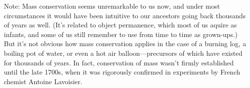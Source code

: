\vspace{\fill}

Note: Mass conservation seems unremarkable to us now, and under most circumstances it would have been intuitive to our ancestors going back thousands of years as well.  (It's related to object permanence, which most of us aquire as infants, and some of us still remember to use from time to time as grown-ups.)  But it's not obvious how mass conservation applies in the case of a burning log, a boiling pot of water, or even a hot air balloon---precursors of which have existed for thousands of years.  In fact, conservation of mass wasn't firmly established until the late 1700s, when it was rigorously confirmed in experiments by French chemist Antoine Lavoisier.

